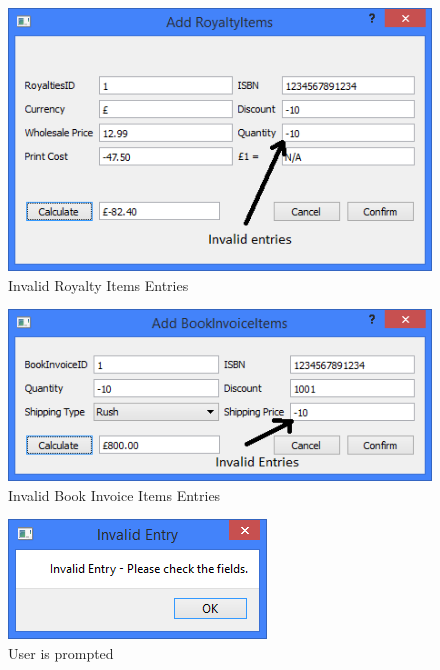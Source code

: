 \begin{figure}[H]
    \includegraphics[width=\textwidth]{./Manual/InvalidEntries.png}
    \caption{Invalid Royalty Items Entries}
\end{figure}

\begin{figure}[H]
    \includegraphics[width=\textwidth]{./Manual/InvalidEntries2.png}
    \caption{Invalid Book Invoice Items Entries}
\end{figure}

\begin{figure}[H]
    \includegraphics[width=\textwidth]{./Manual/Prompt.png}
    \caption{User is prompted}
\end{figure}

